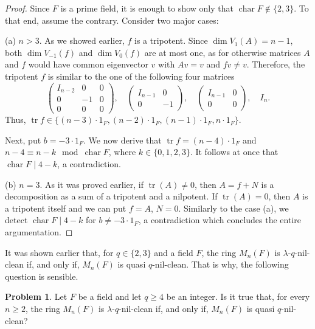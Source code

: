 \documentclass{amsart}
\DeclareMathOperator{\Char}{char}
\DeclareMathOperator{\tr}{tr}
\theoremstyle{definition}
\newtheorem{problem}[theorem]{Problem}
\theoremstyle{remark}
\numberwithin{equation}{section}
\begin{document}
\begin{proof}
Since $F$ is a prime field, it is enough to show only that $\Char F \not \in \{2,3\}$. To that end, assume the contrary. Consider two major cases:

\medskip

(a) $n > 3$. As we showed earlier, $f$ is a tripotent. Since $\dim V_{1}(A) = n-1$, both $\dim V_{-1} (f)$ and $\dim V_{0} (f)$ are at most one, as for otherwise matrices $A$ and $f$ would have common eigenvector $v$ with $Av = v$ and $fv \not = v$. Therefore, the tripotent $f$ is similar to the one of the following four matrices
\[
  \left(
  \begin{array}{c|c|c}
    I_{n-2} & 0 & 0
    \\
    \hline
    0 & -1 & 0
    \\
    \hline
    0 & 0 & 0
  \end{array}
  \right),
  \quad
  \left(
  \begin{array}{c|c}
    I_{n-1} & 0
    \\
    \hline
    0 & -1
  \end{array}
  \right),
  \quad
  \left(
  \begin{array}{c|c}
    I_{n-1} & 0
    \\
    \hline
    0 & 0
  \end{array}
  \right),
  \quad
  I_{n}.
\]
Thus, $\tr f \in \{(n-3) \cdot 1_{F}, (n-2) \cdot 1_{F}, (n-1) \cdot 1_{F}, n \cdot 1_{F}\}$.

Next, put $b = -3 \cdot 1_{F}$. We now derive that $\tr f = (n-4) \cdot 1_{F}$ and $n-4 \equiv n-k \mod \Char F$, where $k \in \{0,1,2,3\}$. It follows at once that $\Char F \mid 4-k$, a contradiction.

\medskip

(b) $n=3$. As it was proved earlier, if $\tr(A) \not = 0$, then $A = f + N$ is a decomposition as a sum of a tripotent and a nilpotent. If $\tr(A) = 0$, then $A$ is a tripotent itself and we can put $f = A$, $N = 0$. Similarly to the case (a), we detect $\Char F \mid 4-k$ for $b \not = -3 \cdot 1_{F}$, a contradiction which concludes the entire argumentation.
\end{proof}


It was shown earlier that, for $q \in \{2,3\}$ and a field $F$, the ring $M_{n}(F)$ is $\lambda$-$q$-nil-clean if, and only if, $M_{n}(F)$ is quasi $q$-nil-clean. That is why, the following question is sensible.

\begin{problem}
Let $F$ be a field and let $q \geq 4$ be an integer. Is it true that, for every $n\geq 2$, the ring $M_{n}(F)$ is $\lambda$-$q$-nil-clean if, and only if, $M_{n}(F)$ is quasi $q$-nil-clean?
\end{problem}
\end{document}
